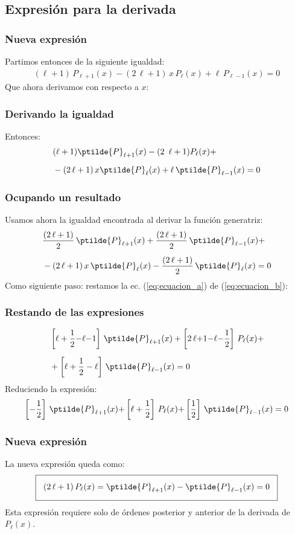 \subsection{Expresión para la derivada}
\begin{frame}
\frametitle{Nueva expresión}
Partimos entonces de la siguiente igualdad:
\begin{align*}
(\ell + 1) \, P_{\ell+1} (x) - (2 \, \ell + 1) \, x \, P_{\ell} (x) + \ell \, P_{\ell-1} (x) = 0
\end{align*}
\pause
Que ahora derivamos con respecto a $x$:
\end{frame}
\begin{frame}
\frametitle{Derivando la igualdad}
Entonces:
\begin{align}
\begin{aligned}
&(\ell + 1) \ptilde{P}_{\ell+1} (x) - (2 \, \ell + 1) P_{\ell} (x) + \\[0.5em]
&- (2 \, \ell +  1) \, x \ptilde{P}_{\ell} (x) + \ell \, \ptilde{P}_{\ell-1} (x) = 0
\end{aligned}
\label{eq;ecuacion_a}
\end{align}
\end{frame}
\begin{frame}
\frametitle{Ocupando un resultado}
Usamos ahora la igualdad encontrada al derivar la función generatriz:
\begin{align}
\begin{aligned}
&\dfrac{(2 \, \ell + 1)}{2} \, \ptilde{P}_{\ell+1} (x) + \dfrac{(2 \, \ell + 1)}{2} \, \ptilde{P}_{\ell-1} (x) + \\[0.5em]
&- (2 \, \ell + 1) \, x \, \ptilde{P}_{\ell} (x) - \dfrac{(2 \, \ell + 1)}{2} \, \ptilde{P}_{\ell} (x) = 0
\end{aligned}
\label{eq:ecuacion_b}
\end{align}
\pause
Como siguiente paso: restamos la ec. (\ref{eq;ecuacion_a}) de (\ref{eq:ecuacion_b}):
\end{frame}
\begin{frame}
\frametitle{Restando de las expresiones}
\begin{align*}
&\left[ \ell + \dfrac{1}{2} {-} \ell {-} 1 \right] \, \ptilde{P}_{\ell+1} (x) + \left[ 2 \, \ell {+} 1 {-} \ell {-} \dfrac{1}{2} \right] \, P_{\ell} (x) + \\[0.5em]
&+ \left[ \ell + \dfrac{1}{2} - \ell \right] \, \ptilde{P}_{\ell-1} (x) = 0
\end{align*}
\pause
Reduciendo la expresión:
\begin{align*}
\left[ - \dfrac{1}{2} \right] \, \ptilde{P}_{\ell+1} (x) {+} \left[ \ell + \dfrac{1}{2} \right] \, P_{\ell} (x) {+} \left[ \dfrac{1}{2} \right] \, \ptilde{P}_{\ell-1} (x) = 0
\end{align*}
\end{frame}
\begin{frame}
\frametitle{Nueva expresión}
La nueva expresión queda como:
\begin{align*}
\setlength{\fboxsep}{3\fboxsep}\boxed{
(2 \, \ell + 1) \, P_{\ell} (x) =    \ptilde{P}_{\ell+1} (x) - \ptilde{P}_{\ell-1} (x) = 0
}
\end{align*}
\pause
Esta expresión requiere solo de órdenes posterior y anterior de la derivada de $P_{\ell}(x)$.
\end{frame}
